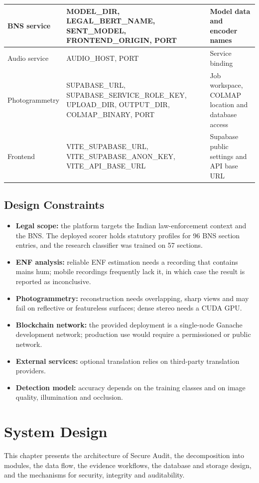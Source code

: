 \documentclass[12pt,a4paper,oneside]{report}
\begin{document}
{\begin{longtable}{|>{\raggedright\arraybackslash}p{2.46cm}|>{\raggedright\arraybackslash}p{7.01cm}|>{\raggedright\arraybackslash}p{4.73cm}|}
BNS service & MODEL\_DIR, LEGAL\_BERT\_NAME, SENT\_MODEL, FRONTEND\_ORIGIN, PORT & Model data and encoder names \\ \hline
Audio service & AUDIO\_HOST, PORT & Service binding \\ \hline
Photogrammetry & SUPABASE\_URL, SUPABASE\_SERVICE\_ROLE\_KEY, UPLOAD\_DIR, OUTPUT\_DIR, COLMAP\_BINARY, PORT & Job workspace, COLMAP location and database access \\ \hline
Frontend & VITE\_SUPABASE\_URL, VITE\_SUPABASE\_ANON\_KEY, VITE\_API\_BASE\_URL & Supabase public settings and API base URL \\ \hline
\end{longtable}
}

\section{Design Constraints}
\begin{itemize}
  \item \textbf{Legal scope:} the platform targets the Indian law-enforcement context and the BNS. The deployed scorer holds statutory profiles for 96 BNS section entries, and the research classifier was trained on 57 sections.
  \item \textbf{ENF analysis:} reliable ENF estimation needs a recording that contains mains hum; mobile recordings frequently lack it, in which case the result is reported as inconclusive.
  \item \textbf{Photogrammetry:} reconstruction needs overlapping, sharp views and may fail on reflective or featureless surfaces; dense stereo needs a CUDA GPU.
  \item \textbf{Blockchain network:} the provided deployment is a single-node Ganache development network; production use would require a permissioned or public network.
  \item \textbf{External services:} optional translation relies on third-party translation providers.
  \item \textbf{Detection model:} accuracy depends on the training classes and on image quality, illumination and occlusion.
\end{itemize}

\chapter{System Design}
This chapter presents the architecture of Secure Audit, the decomposition into modules, the data flow, the evidence workflows, the database and storage design, and the mechanisms for security, integrity and auditability.
\end{document}
